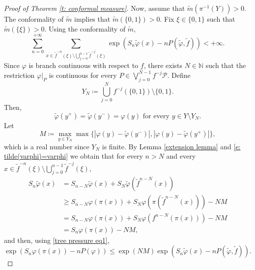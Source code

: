 \documentclass[10pt,a4paper]{amsart}
\numberwithin{equation}{section} %
\numberwithin{figure}{section} %
\newcommand{\N}{\mathbb{N}}
\renewcommand{\=}{\coloneqq}
\begin{document}
\begin{proof}[Proof of Theorem \ref{t: conformal measure}]
Now, assume that $\widetilde{m}(\pi^{-1}(Y))>0$. The conformality of $\widetilde{m}$ implies that $\widetilde{m}(\{0,1\})>0$. Fix $\xi\in \{0,1\}$ such that $\widetilde{m}({\{\xi\}})>0$. Using the conformality of $\widetilde{m}$,
\begin{equation}\label{e: finite series extension}
     \sum_{n=0}^{+\infty} \sum_{x\in \widetilde{f}^{-n}(\xi)\setminus \bigcup_{j=0}^{n-1}\widetilde{f}^{-j}(\xi)} \exp(S_n\widetilde{\varphi}(x) - nP(\widetilde{\varphi},\widetilde{f})) <+\infty.
\end{equation}
Since $\varphi$ is branch continuous with respect to $f$, there exists $N\in \N$ such that the restriction $\varphi|_{P}$ is continuous for every $P\in \bigvee_{j=0}^{N-1}f^{-j}\mathcal{P}$. Define 
\begin{equation}
    Y_N \= \bigcup_{j=0}^{N}f^{-j}(\{0,1\})\setminus\{0,1\}.
\end{equation}
Then,
\begin{equation}\label{e: tilde(varphi)=varphi}
    \widetilde{\varphi}(y^+) = \widetilde{\varphi}(y^-) = \varphi(y) \text{ for every }y\in Y\setminus Y_N.
\end{equation}
Let
\begin{equation*}
M\= \max_{y\in Y_N}\max\{|\varphi(y) - \widetilde{\varphi}(y^{-})|,|\varphi(y) - \widetilde{\varphi}(y^{+})|\},
\end{equation*}
which is a real number since $Y_N$ is finite.
By Lemma \ref{extension lemma} and \eqref{e: tilde(varphi)=varphi} we obtain that for every $n>N$ and every $x\in \widetilde{f}^{-n}(\xi)\setminus \bigcup_{j=0}^{n-1}\widetilde{f}^{-j}(\xi)$,
\begin{equation*}
    \begin{split}
        S_n\widetilde{\varphi}(x) &= S_{n-N}\widetilde{\varphi}(x) + S_N\widetilde{\varphi}(\widetilde{f}^{n-N}(x))\\
        & \geq S_{n-N}\varphi(\pi(x)) + S_{N}\varphi(\pi(\widetilde{f}^{n-N}(x))) - NM\\
        &= S_{n-N}\varphi(\pi(x)) + S_{N}\varphi(f^{n-N}(\pi(x))) - NM\\
        &= S_n\varphi(\pi(x)) - NM,
    \end{split}
\end{equation*}
and then, using \eqref{tree pressure eq1},
\begin{equation}\label{e: bound S_nvarphi by S_n tilde(varphi)}
    \exp(S_n\varphi(\pi(x)) - nP(\varphi)) \leq \exp(NM)\exp(S_n\widetilde{\varphi}(x)-nP(\widetilde{\varphi},\widetilde{f})).

\end{equation}
\end{proof}
\end{document}
